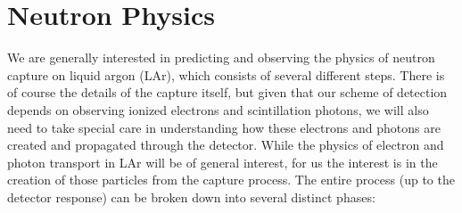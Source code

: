 \documentclass[8pt]{refart}
\begin{document}
\section{Neutron Physics}
We are generally interested in predicting and observing the physics of neutron capture on liquid argon (LAr), which consists of several different steps.  There is of course the details of the capture itself, but given that our scheme of detection depends on observing ionized electrons and scintillation photons, we will also need to take special care in understanding how these electrons and photons are created and propagated through the detector.  While the physics of electron and photon transport in LAr will be of general interest, for us the interest is in the creation of those particles from the capture process.  The entire process (up to the detector response) can be broken down into several distinct phases:
\end{document}
